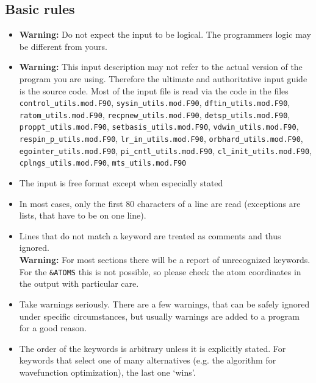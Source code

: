 \documentclass[twoside,10pt,titlepage,a4paper]{article}
\begin{document}
\subsection{Basic rules}
\begin{itemize}
  \item \textbf{Warning:} Do not expect the input to be logical.
    The programmers logic may be different from yours.

  \item \textbf{Warning:} This input description may not refer to the actual
    version of the program you are using. Therefore the ultimate and
    authoritative input guide is the source code. Most of the input
    file is read via the code in the files\\ 
    \texttt{control\_utils.mod.F90},  \texttt{sysin\_utils.mod.F90},    \texttt{dftin\_utils.mod.F90}, 
    \texttt{ratom\_utils.mod.F90},    \texttt{recpnew\_utils.mod.F90},  \texttt{detsp\_utils.mod.F90},
    \texttt{proppt\_utils.mod.F90},   \texttt{setbasis\_utils.mod.F90}, \texttt{vdwin\_utils.mod.F90},
    \texttt{respin\_p\_utils.mod.F90}, \texttt{lr\_in\_utils.mod.F90},  \texttt{orbhard\_utils.mod.F90},
    \texttt{egointer\_utils.mod.F90}, \texttt{pi\_cntl\_utils.mod.F90}, \texttt{cl\_init\_utils.mod.F90}, 
    \texttt{cplngs\_utils.mod.F90},  \texttt{mts\_utils.mod.F90}


  \item The input is free format except when especially stated

  \item In most cases, only the first 80 characters of a line are read
   (exceptions are lists, that have to be on one line).

  \item Lines that do not match a keyword are treated as comments
    and thus ignored.\\
    \textbf{Warning:} For most sections there will be a report of
    unrecognized keywords. For the \verb+&ATOMS+ this is not possible,
    so please check the atom coordinates in the output with particular
    care.

  \item Take warnings seriously. There are a few warnings, that can
   be safely ignored under specific circumstances, but usually warnings
   are added to a program for a good reason.

  \item The order of the keywords is arbitrary unless it is explicitly
    stated. For keywords that select one of many alternatives (e.g. the
    algorithm for wavefunction optimization), the last one `wins'.


\end{itemize}
\end{document}
